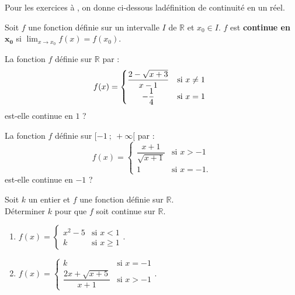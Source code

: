 Pour les exercices  à , on donne ci-dessous la\linebreak définition de continuité en un réel.

\begin{cadre}[A1][A4]
Soit $f$ une fonction définie sur un intervalle $I$ de $\mathbb{R}$ et $x_0\in I$.
$f$ est \textbf{continue en} $\boldsymbol{x_0}$ si $\displaystyle\lim_{x\rightarrow x_0}f(x)=f(x_0)$.
 \end{cadre}



  \begin{exercice}\label{continuite_first}
La fonction $f$ définie sur $\mathbb{R}$ par :
    \[f (x)= \left\{\begin{array}{@{}cl}
    \dfrac{2 - \sqrt{x + 3}}{x - 1} & \text{si~} x\neq1\\
    -\dfrac{1}{4} & \text{si~} x=1
    \end{array}\right. \]
est-elle continue en $1$ ?
\end{exercice}

\begin{exercice}
 La fonction $f$ définie sur $[-1~;~+\infty[$ par :
    \[f(x)=\left\{
      \begin{array}{ll}
       \dfrac{x + 1}{\sqrt{x + 1}} & \text{si } x>-1\\
       1 & \text{si } x=-1.
      \end{array}\right.\]
est-elle continue en $-1$ ?
\end{exercice}
%
%
\begin{exercice}
 Soit $k$ un entier et $f$ une fonction définie sur $\mathbb{R}$.\\
 Déterminer $k$ pour que $f$  soit continue sur $\mathbb{R}$.
\begin{enumerate}
\item $f(x) =\left\{\begin{array}{ll}
      x^2 - 5 & \text{si } x < 1 \\
       k & \text{si } x \geqslant 1
    \end{array}\right.$.
\item $f(x) =\left\{\begin{array}{ll}
    k & \text{si } x= -1 \\
    \dfrac{2x + \sqrt{x + 5}}{x + 1} & \text{si } x>-1
  \end{array}\right.$.
  \end{enumerate}
\end{exercice}


